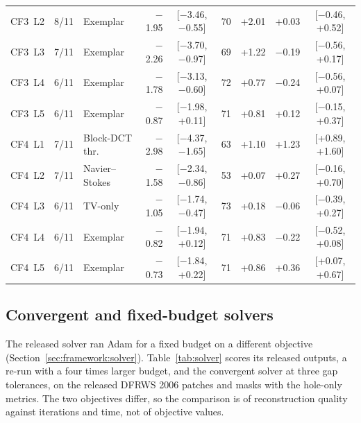 \documentclass[final,3p]{elsarticle}
\begin{document}
\begin{table}[!t]
\begin{tabular}{@{}l c l r c r r r c@{}}
CF3~L2 & 8/11 & Exemplar & $-$1.95 & [$-$3.46, $-$0.55] & 70 & +2.01 & +0.03 & [$-$0.46, +0.52] \\
CF3~L3 & 7/11 & Exemplar & $-$2.26 & [$-$3.70, $-$0.97] & 69 & +1.22 & $-$0.19 & [$-$0.56, +0.17] \\
CF3~L4 & 6/11 & Exemplar & $-$1.78 & [$-$3.13, $-$0.60] & 72 & +0.77 & $-$0.24 & [$-$0.56, +0.07] \\
CF3~L5 & 6/11 & Exemplar & $-$0.87 & [$-$1.98, +0.11] & 71 & +0.81 & +0.12 & [$-$0.15, +0.37] \\
\midrule
CF4~L1 & 7/11 & Block-DCT thr. & $-$2.98 & [$-$4.37, $-$1.65] & 63 & +1.10 & +1.23 & [+0.89, +1.60] \\
CF4~L2 & 7/11 & Navier--Stokes & $-$1.58 & [$-$2.34, $-$0.86] & 53 & +0.07 & +0.27 & [$-$0.16, +0.70] \\
CF4~L3 & 6/11 & TV-only & $-$1.05 & [$-$1.74, $-$0.47] & 73 & +0.18 & $-$0.06 & [$-$0.39, +0.27] \\
CF4~L4 & 6/11 & Exemplar & $-$0.82 & [$-$1.94, +0.12] & 71 & +0.83 & $-$0.22 & [$-$0.52, +0.08] \\
CF4~L5 & 6/11 & Exemplar & $-$0.73 & [$-$1.84, +0.22] & 71 & +0.86 & +0.36 & [+0.07, +0.67] \\
\bottomrule
\end{tabular}
\end{table}

\subsection{Convergent and fixed-budget solvers}
\label{sec:results:solver}

The released solver ran Adam for a fixed budget on a different objective (Section~\ref{sec:framework:solver}). Table~\ref{tab:solver} scores its released outputs, a re-run with a four times larger budget, and the convergent solver at three gap tolerances, on the released DFRWS 2006 patches and masks with the hole-only metrics. The two objectives differ, so the comparison is of reconstruction quality against iterations and time, not of objective values.
\end{document}
